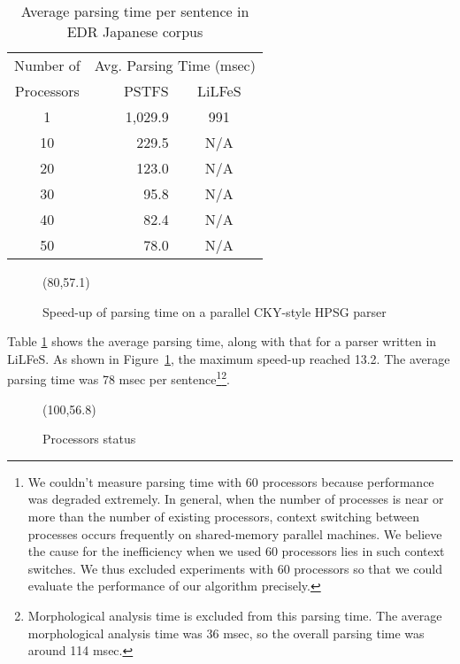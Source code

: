 \begin{table}[t]
\begin{center}
{\small
\begin{tabular}{|c|r|c|}
\hline
Number of 	& \multicolumn{2}{c|}{Avg. Parsing Time (msec)}\\
\cline{2-3}
Processors	& PSTFS		& LiLFeS\\
\hline
\hline
1		& 1,029.9	& 991	\\
\hline
10		&  229.5	&N/A\\
\hline
20		&  123.0	&N/A\\
\hline
30		&   95.8	&N/A\\
\hline
40		&   82.4	&N/A\\
\hline
50		&   78.0	&N/A\\
\hline
\end{tabular}
\caption{Average parsing time per sentence in EDR Japanese corpus}
\label{tab:cky-time}
}
\end{center}
\end{table}

\begin{figure}[t]
\begin{center}
\atari(80,57.1)
\caption{Speed-up of parsing time on a parallel CKY-style HPSG parser}
\label{fig:cky-speedup}
\end{center}
\end{figure}

 Table \ref{tab:cky-time} shows the average parsing time, along with
that for a parser written in LiLFeS.  As shown in
Figure~\ref{fig:cky-speedup}, the maximum speed-up reached 13.2.  The
average parsing time was 78 msec per sentence\footnote{We couldn't
measure parsing time with 60 processors because performance was
degraded extremely.  In general, when the number of processes is near
or more than the number of existing processors, context switching
between processes occurs frequently on shared-memory parallel
machines.  We believe the cause for the inefficiency when we used 60
processors lies in such context switches.  We thus excluded
experiments with 60 processors so that we could evaluate the
performance of our algorithm precisely.}\footnote{Morphological
analysis time is excluded from this parsing time.  The average
morphological analysis time was 36 msec, so the overall parsing time
was around 114 msec.}.

\begin{figure}[t]
\begin{center}
\atari(100,56.8)
\caption{Processors status}
\label{fig:prof}
\end{center}
\end{figure}

